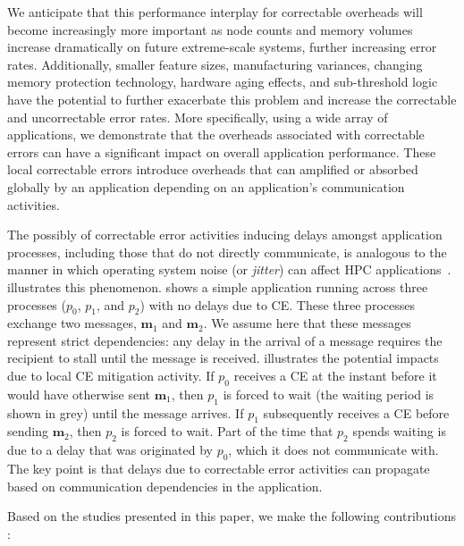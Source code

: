 We anticipate that this performance interplay for correctable overheads will
become increasingly more important as node counts and memory volumes increase
dramatically on future extreme-scale systems, further increasing error rates.
Additionally, smaller feature sizes, manufacturing variances, changing memory
protection technology, hardware aging effects, and sub-threshold logic have the
potential to further exacerbate this problem and increase the correctable and
uncorrectable error rates.  More specifically, using a wide array of
applications, we demonstrate that the overheads associated with  correctable
errors can have a significant impact on overall application performance.  These
local correctable errors introduce overheads that can amplified or absorbed
globally by an application depending on an application's communication
activities. 

The possibly of correctable error activities inducing delays amongst application
processes, including those that do not directly communicate, is analogous to the
manner in which operating system noise (or \emph{jitter}) can affect HPC
applications~\cite{Hoefler:2010:Characterizing, Ferreira:08:characterizing}.
 illustrates this phenomenon.   shows
a simple application running across three processes ($p_0$, $p_1$, and $p_2$)
with no delays due to CE.  These three processes exchange two messages,
$\mathbf{m}_1$ and $\mathbf{m}_2$.  We assume here that these messages represent
strict dependencies: any delay in the arrival of a message requires the
recipient to stall until the message is received. 
illustrates the potential impacts due to local CE mitigation activity.  If $p_0$
receives a CE at the instant before it would have otherwise sent $\mathbf{m}_1$,
then $p_1$ is forced to wait (the waiting period is shown in grey) until the
message arrives.  If $p_1$ subsequently receives a CE before sending
$\mathbf{m}_2$, then $p_2$ is forced to wait.  Part of the time that $p_2$
spends waiting is due to a delay that was originated by $p_0$, which it does not
communicate with.  The key point is that delays due to correctable error
activities can propagate based on communication dependencies in the application.

Based on the studies presented in this paper, we make the following
contributions :

